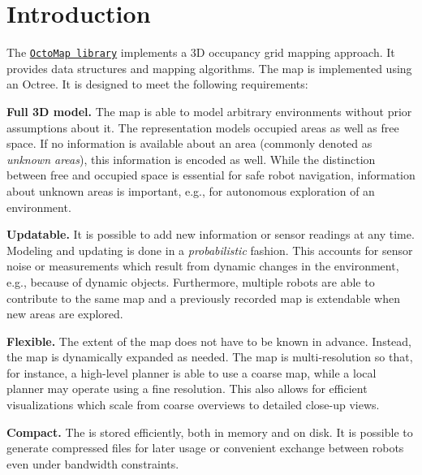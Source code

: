 \hypertarget{index_intro_sec}{}\section{Introduction}\label{index_intro_sec}
The \href{http://octomap.github.com/}{\tt Octo\+Map library} implements a 3\+D occupancy grid mapping approach. It provides data structures and mapping algorithms. The map is implemented using an Octree. It is designed to meet the following requirements\+: 


\begin{DoxyItemize}
\item {\bfseries Full 3\+D model.} The map is able to model arbitrary environments without prior assumptions about it. The representation models occupied areas as well as free space. If no information is available about an area (commonly denoted as {\itshape unknown areas}), this information is encoded as well. While the distinction between free and occupied space is essential for safe robot navigation, information about unknown areas is important, e.\+g., for autonomous exploration of an environment.  
\item {\bfseries Updatable.} It is possible to add new information or sensor readings at any time. Modeling and updating is done in a {\itshape probabilistic} fashion. This accounts for sensor noise or measurements which result from dynamic changes in the environment, e.\+g., because of dynamic objects. Furthermore, multiple robots are able to contribute to the same map and a previously recorded map is extendable when new areas are explored.


\item {\bfseries Flexible.} The extent of the map does not have to be known in advance. Instead, the map is dynamically expanded as needed. The map is multi-\/resolution so that, for instance, a high-\/level planner is able to use a coarse map, while a local planner may operate using a fine resolution. This also allows for efficient visualizations which scale from coarse overviews to detailed close-\/up views.  
\item {\bfseries Compact.} The is stored efficiently, both in memory and on disk. It is possible to generate compressed files for later usage or convenient exchange between robots even under bandwidth constraints.  
\end{DoxyItemize}

